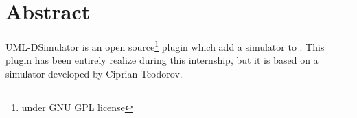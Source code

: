 \chapter*{Abstract}

UML-DSimulator is an open source\footnote{under GNU GPL license} plugin which add a simulator to \umld. This plugin has been entirely realize during this internship, but it is based on a simulator developed by Ciprian Teodorov.



